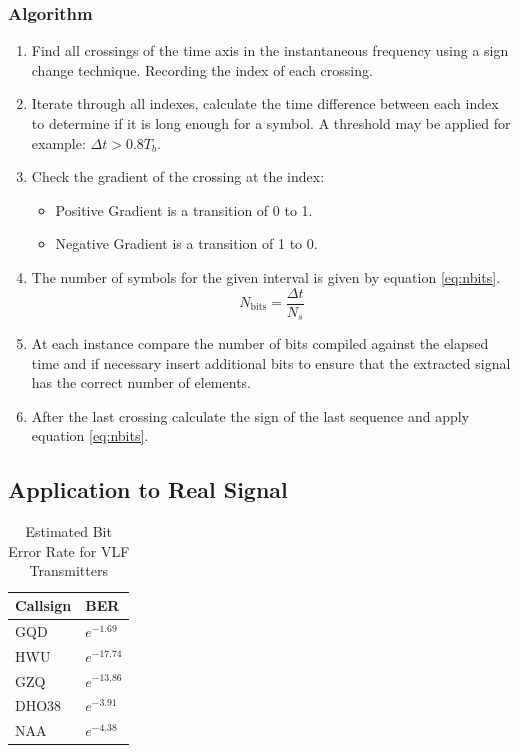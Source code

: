 \subsubsection{Algorithm}
\begin{enumerate}
    \item Find all crossings of the time axis in the instantaneous frequency using a sign change technique. Recording the index of each crossing.
    \item Iterate through all indexes, calculate the time difference between each index to determine if it is long enough for a symbol. A threshold may be applied for example: $\Delta t > 0.8T_b$.
    \item Check the gradient of the crossing at the index:
    \begin{itemize}
        \item Positive Gradient is a transition of 0 to 1.
        \item Negative Gradient is a transition of 1 to 0.
    \end{itemize}
    \item The number of symbols for the given interval is given by equation \ref{eq:nbits}.
    \begin{equation}
        N_{\text{bits}} = \frac{\Delta t}{N_s}
        \label{eq:nbits}
    \end{equation}
    \item At each instance compare the number of bits compiled against the elapsed time and if necessary insert additional bits to ensure that the extracted signal has the correct number of elements.
    \item After the last crossing calculate the sign of the last sequence and apply equation \ref{eq:nbits}.
\end{enumerate}




\subsection{Application to Real Signal}
\begin{table}[h!]
    \centering
    \begin{tabular}{l|l}
    Callsign & BER           \\
    \hline
    GQD      & $e^{-1.69}$  \\
    HWU      & $e^{-17.74}$ \\
    GZQ      & $e^{-13.86}$ \\
    DHO38    & $e^{-3.91}$  \\
    NAA      & $e^{-4.38}$ 
    \end{tabular}
    \caption{Estimated Bit Error Rate for VLF Transmitters}
    \label{tab:BER Real}
\end{table}

